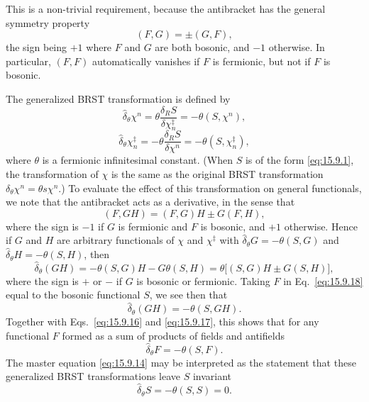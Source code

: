 This is a non-trivial requirement, because the antibracket has the general
symmetry property
\begin{equation}
(F,G)=\pm(G,F),
\tag{15.9.15}\label{eq:15.9.15}
\end{equation}
the sign being $+1$ where $F$ and $G$ are both bosonic, and $-1$ otherwise. In
particular, $(F,F)$ automatically vanishes if $F$ is fermionic, but not if $F$
is bosonic.

The generalized BRST transformation is defined by
\begin{equation}
\widehat\delta_\theta\chi^n
=\theta\frac{\delta_R S}{\delta\chi_n^{\ddagger}}
=-\theta(S,\chi^n),
\tag{15.9.16}\label{eq:15.9.16}
\end{equation}
\begin{equation}
\widehat\delta_\theta\chi_n^{\ddagger}
=-\theta\frac{\delta_R S}{\delta\chi^n}
=-\theta(S,\chi_n^{\ddagger}),
\tag{15.9.17}\label{eq:15.9.17}
\end{equation}
where $\theta$ is a fermionic infinitesimal constant. (When $S$ is of the form
\eqref{eq:15.9.1}, the transformation of $\chi$ is the same as the original
BRST transformation $\delta_\theta\chi^n=\theta s\chi^n$.) To evaluate the
effect of this transformation on general functionals, we note that the
antibracket acts as a derivative, in the sense that
\begin{equation}
(F,GH)=(F,G)H\pm G(F,H),
\tag{15.9.18}\label{eq:15.9.18}
\end{equation}
where the sign is $-1$ if $G$ is fermionic and $F$ is bosonic, and $+1$
otherwise. Hence if $G$ and $H$ are arbitrary functionals of $\chi$ and
$\chi^{\ddagger}$ with $\widehat\delta_\theta G=-\theta(S,G)$ and
$\widehat\delta_\theta H=-\theta(S,H)$, then
\[
\widehat\delta_\theta(GH)
=-\theta(S,G)H-G\theta(S,H)
=\theta\bigl[(S,G)H\pm G(S,H)\bigr],
\]
where the sign is $+$ or $-$ if $G$ is bosonic or fermionic. Taking $F$ in
Eq.~\eqref{eq:15.9.18} equal to the bosonic functional $S$, we see then that
\[
\widehat\delta_\theta(GH)=-\theta(S,GH).
\]
Together with Eqs.~\eqref{eq:15.9.16} and \eqref{eq:15.9.17}, this shows that
for any functional $F$ formed as a sum of products of fields and antifields
\begin{equation}
\widehat\delta_\theta F=-\theta(S,F).
\tag{15.9.19}\label{eq:15.9.19}
\end{equation}
The master equation \eqref{eq:15.9.14} may be interpreted as the statement
that these generalized BRST transformations leave $S$ invariant
\begin{equation}
\widehat\delta_\theta S=-\theta(S,S)=0.
\tag{15.9.20}\label{eq:15.9.20}
\end{equation}
